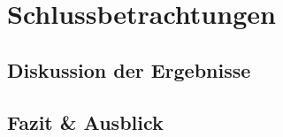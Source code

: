\chapter{Schlussbetrachtungen}\label{ch:conclusion}

\section{Diskussion der Ergebnisse}

\section{Fazit \& Ausblick}
